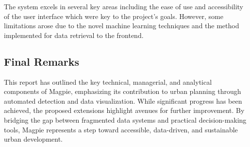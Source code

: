 The system excels in several key areas including the ease of use and
accessibility of the user interface which were key to the project's goals.
However, some limitations arose due to the novel machine learning techniques and
the method implemented for data retrieval to the frontend.

\subsection{Final Remarks}
This report has outlined the key technical, managerial, and analytical
components of Magpie, emphasizing its contribution to urban planning through
automated detection and data visualization. While significant progress has been
achieved, the proposed extensions highlight avenues for further improvement. By
bridging the gap between fragmented data systems and practical decision-making
tools, Magpie represents a step toward accessible, data-driven, and sustainable
urban development.

\newpage{}
